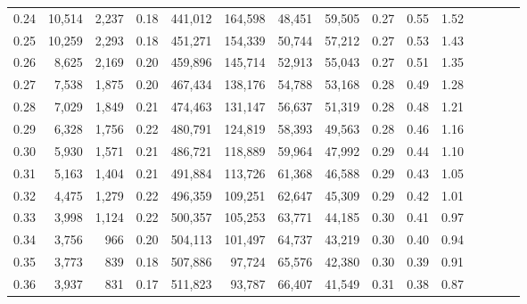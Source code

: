 \begin{tabular}{rrrcrrrrrrrrrrr}
0.24 &  10,514 &  2,237 &                                       0.18 &  441,012 &  164,598 &   48,451 &   59,505 &  0.27 &  0.55 &                         1.52 \\
0.25 &  10,259 &  2,293 &                                       0.18 &  451,271 &  154,339 &   50,744 &   57,212 &  0.27 &  0.53 &                         1.43 \\
0.26 &   8,625 &  2,169 &                                       0.20 &  459,896 &  145,714 &   52,913 &   55,043 &  0.27 &  0.51 &                         1.35 \\
0.27 &   7,538 &  1,875 &                                       0.20 &  467,434 &  138,176 &   54,788 &   53,168 &  0.28 &  0.49 &                         1.28 \\
0.28 &   7,029 &  1,849 &                                       0.21 &  474,463 &  131,147 &   56,637 &   51,319 &  0.28 &  0.48 &                         1.21 \\
0.29 &   6,328 &  1,756 &                                       0.22 &  480,791 &  124,819 &   58,393 &   49,563 &  0.28 &  0.46 &                         1.16 \\
0.30 &   5,930 &  1,571 &                                       0.21 &  486,721 &  118,889 &   59,964 &   47,992 &  0.29 &  0.44 &                         1.10 \\
0.31 &   5,163 &  1,404 &                                       0.21 &  491,884 &  113,726 &   61,368 &   46,588 &  0.29 &  0.43 &                         1.05 \\
0.32 &   4,475 &  1,279 &                                       0.22 &  496,359 &  109,251 &   62,647 &   45,309 &  0.29 &  0.42 &                         1.01 \\
0.33 &   3,998 &  1,124 &                                       0.22 &  500,357 &  105,253 &   63,771 &   44,185 &  0.30 &  0.41 &                         0.97 \\
0.34 &   3,756 &    966 &                                       0.20 &  504,113 &  101,497 &   64,737 &   43,219 &  0.30 &  0.40 &                         0.94 \\
0.35 &   3,773 &    839 &                                       0.18 &  507,886 &   97,724 &   65,576 &   42,380 &  0.30 &  0.39 &                         0.91 \\
0.36 &   3,937 &    831 &                                       0.17 &  511,823 &   93,787 &   66,407 &   41,549 &  0.31 &  0.38 &                         0.87 \\

\end{tabular}
